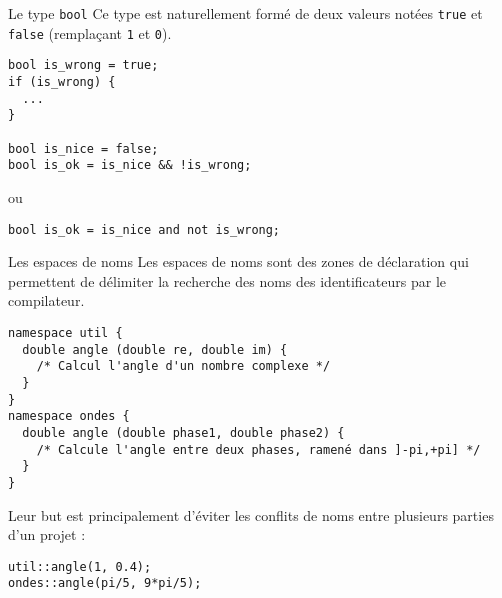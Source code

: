 \documentclass[c]{beamer}
\newcommand{\inline}[1]{\texttt{#1}}
\begin{document}
\begin{frame}[fragile]{Le type \texttt{bool}}
Ce type est naturellement formé de deux valeurs notées \inline{true} et \inline{false} (remplaçant \texttt{1} et \texttt{0}).
\vspace{1em}

\begin{verbatim}
bool is_wrong = true;
if (is_wrong) {
  ...
}

bool is_nice = false;
bool is_ok = is_nice && !is_wrong;
\end{verbatim}
ou
\begin{verbatim}
bool is_ok = is_nice and not is_wrong;
\end{verbatim}

\end{frame}


\begin{frame}[fragile]{Les espaces de noms}
Les espaces de noms sont des zones de déclaration qui permettent de délimiter la recherche des noms des identificateurs par le compilateur.

\begin{verbatim}
namespace util {
  double angle (double re, double im) {
    /* Calcul l'angle d'un nombre complexe */
  }
}
namespace ondes {
  double angle (double phase1, double phase2) {
    /* Calcule l'angle entre deux phases, ramené dans ]-pi,+pi] */
  }
}
\end{verbatim}

Leur but est principalement d'éviter les conflits de noms entre plusieurs parties d'un projet :

\begin{verbatim}
util::angle(1, 0.4);
ondes::angle(pi/5, 9*pi/5);
\end{verbatim}

\end{frame}
\end{document}
